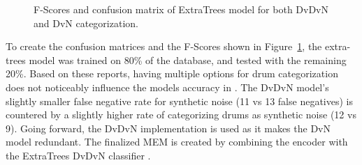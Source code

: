 \documentclass[\main/thesis.tex]{subfiles}
\begin{document}
\begin{figure}[htbp]
\begin{center}
\end{center}


\caption{F-Scores and confusion matrix of ExtraTrees model for both DvDvN and DvN categorization.}
\label{fig:conf_f1_dvn}
\end{figure}

To create the confusion matrices and the F-Scores shown in Figure~\ref{fig:conf_f1_dvn}, the extra-trees model was trained on 80\% of the database, and tested with the remaining 20\%. Based on these reports, having multiple options for drum categorization does not noticeably influence the models accuracy in \decfirst. The DvDvN model's slightly smaller false negative rate for synthetic noise (11 vs 13 false negatives) is countered by a slightly higher rate of categorizing drums as synthetic noise (12 vs 9). Going forward, the DvDvN implementation is used as it makes the DvN model redundant. The finalized MEM is created by combining the encoder with the ExtraTrees DvDvN classifier .
\end{document}
